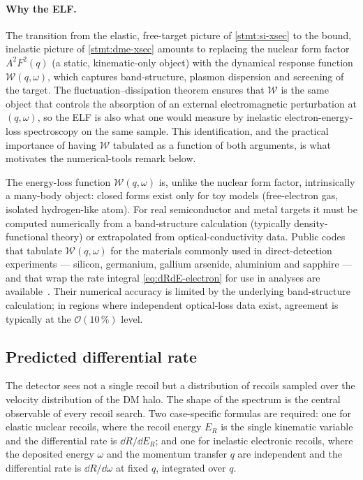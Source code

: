 \paragraph{Why the ELF.}
The transition from the elastic, free-target picture of
\cref{stmt:si-xsec} to the bound, inelastic picture of
\cref{stmt:dme-xsec} amounts to replacing the nuclear form factor
$A^2 F^2(q)$ (a static, kinematic-only object) with the dynamical
response function $\mathcal{W}(q,\omega)$, which captures
band-structure, plasmon dispersion and screening of the target. The
fluctuation--dissipation theorem ensures that $\mathcal{W}$ is the
same object that controls the absorption of an external
electromagnetic perturbation at $(q,\omega)$, so the ELF is also
what one would measure by inelastic electron-energy-loss
spectroscopy on the same sample. This identification, and the
practical importance of having $\mathcal{W}$ tabulated as a
function of both arguments, is what motivates the numerical-tools
remark below.

\begin{remark}
The energy-loss function $\mathcal{W}(q,\omega)$ is, unlike the
nuclear form factor, intrinsically a many-body object: closed
forms exist only for toy models (free-electron gas, isolated
hydrogen-like atom). For real semiconductor and metal targets it
must be computed numerically from a band-structure calculation
(typically density-functional theory) or extrapolated from
optical-conductivity data. Public codes that tabulate
$\mathcal{W}(q,\omega)$ for the materials commonly used in
direct-detection experiments --- silicon, germanium, gallium
arsenide, aluminium and sapphire --- and that wrap the rate
integral \cref{eq:dRdE-electron} for use in analyses are
available~\cite{knapen2021}. Their numerical accuracy is limited by
the underlying band-structure calculation; in regions where
independent optical-loss data exist, agreement is typically at the
$\mathcal O(10\,\%)$ level.
\end{remark}

\subsection{Predicted differential rate}
\label{sec:recoil-rate}

\begin{phenomenon}
The detector sees not a single recoil but a distribution of
recoils sampled over the velocity distribution of the DM halo.
The shape of the spectrum is the central observable of every
recoil search. Two case-specific formulas are required: one for
elastic nuclear recoils, where the recoil energy $E_R$ is the
single kinematic variable and the differential rate is
$\dd R/\dd E_R$; and one for inelastic electronic recoils, where
the deposited energy $\omega$ and the momentum transfer $q$ are
independent and the differential rate is $\dd R/\dd \omega$ at
fixed $q$, integrated over $q$.
\end{phenomenon}


